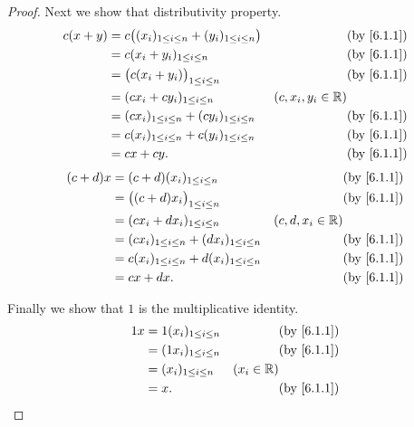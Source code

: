 \begin{proof}
  Next we show that distributivity property.
  \begin{align*}
    c(x + y) & = c\big((x_i)_{1 \leq i \leq n} + (y_i)_{1 \leq i \leq n}\big) &                      & \text{(by \cref{6.1.1})} \\
             & = c(x_i + y_i)_{1 \leq i \leq n}                               &                      & \text{(by \cref{6.1.1})} \\
             & = \big(c(x_i + y_i)\big)_{1 \leq i \leq n}                     &                      & \text{(by \cref{6.1.1})} \\
             & = (c x_i + c y_i)_{1 \leq i \leq n}                            & (c, x_i, y_i \in \R)                            \\
             & = (c x_i)_{1 \leq i \leq n} + (c y_i)_{1 \leq i \leq n}        &                      & \text{(by \cref{6.1.1})} \\
             & = c(x_i)_{1 \leq i \leq n} + c(y_i)_{1 \leq i \leq n}          &                      & \text{(by \cref{6.1.1})} \\
             & = cx + cy.                                                     &                      & \text{(by \cref{6.1.1})}
  \end{align*}
  \begin{align*}
    (c + d)x & = (c + d)(x_i)_{1 \leq i \leq n}                        &                    & \text{(by \cref{6.1.1})} \\
             & = \big((c + d) x_i\big)_{1 \leq i \leq n}               &                    & \text{(by \cref{6.1.1})} \\
             & = (c x_i + d x_i)_{1 \leq i \leq n}                     & (c, d, x_i \in \R)                            \\
             & = (c x_i)_{1 \leq i \leq n} + (d x_i)_{1 \leq i \leq n} &                    & \text{(by \cref{6.1.1})} \\
             & = c(x_i)_{1 \leq i \leq n} + d(x_i)_{1 \leq i \leq n}   &                    & \text{(by \cref{6.1.1})} \\
             & = cx + dx.                                              &                    & \text{(by \cref{6.1.1})}
  \end{align*}

  Finally we show that \(1\) is the multiplicative identity.
  \begin{align*}
    1 x & = 1 (x_i)_{1 \leq i \leq n} &              & \text{(by \cref{6.1.1})} \\
        & = (1 x_i)_{1 \leq i \leq n} &              & \text{(by \cref{6.1.1})} \\
        & = (x_i)_{1 \leq i \leq n}   & (x_i \in \R)                            \\
        & = x.                        &              & \text{(by \cref{6.1.1})}
  \end{align*}
\end{proof}

